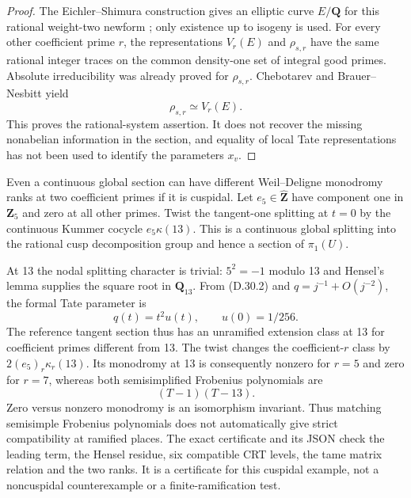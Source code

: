 \begin{proof}
The Eichler--Shimura construction gives an elliptic curve
$E/\mathbf Q$ for this rational weight-two newform
\citep[Proposition~11.21]{D_MilneMF2017};
only existence up to isogeny is used.
For every other coefficient prime $r$, the representations
$V_r(E)$ and $\rho_{s,r}$ have the same rational integer
traces on the common density-one set of integral good
primes. Absolute irreducibility was already proved for
$\rho_{s,r}$. Chebotarev and Brauer--Nesbitt yield
\[
                       \rho_{s,r}\simeq V_r(E).
\]
This proves the rational-system assertion.
It does not recover the missing nonabelian information
in the section, and equality of local Tate representations
has not been used to identify the parameters $x_v$.
\end{proof}

Even a continuous global section can have different
Weil--Deligne monodromy ranks at two coefficient primes
if it is cuspidal.
Let $e_5\in\widehat{\mathbf Z}$ have component one in
$\mathbf Z_5$ and zero at all other primes.
Twist the tangent-one splitting at $t=0$ by the continuous
Kummer cocycle $e_5\kappa(13)$.
This is a continuous global splitting into the rational
cusp decomposition group and hence a section of $\pi_1(U)$.

At 13 the nodal splitting character is trivial:
$5^2=-1$ modulo 13 and Hensel's lemma supplies the square
root in $\mathbf Q_{13}$. From \textup{(D.30.2)} and
$q=j^{-1}+O(j^{-2})$, the formal Tate parameter is
\[
              q(t)=t^2u(t),\qquad u(0)=1/256.
\]
The reference tangent section thus has an unramified
extension class at 13 for coefficient primes different
from 13. The twist changes the coefficient-$r$ class by
$2(e_5)_r\kappa_r(13)$.
Its monodromy at 13 is consequently nonzero for $r=5$
and zero for $r=7$, whereas both semisimplified
Frobenius polynomials are
\[
                         (T-1)(T-13).
\]
Zero versus nonzero monodromy is an isomorphism invariant.
Thus matching semisimple Frobenius polynomials does not
automatically give strict compatibility at ramified places.
The exact certificate
 and its JSON
check the leading term, the Hensel residue, six compatible
CRT levels, the tame matrix relation and the two ranks.
It is a certificate for this cuspidal example, not a
noncuspidal counterexample or a finite-ramification test.

